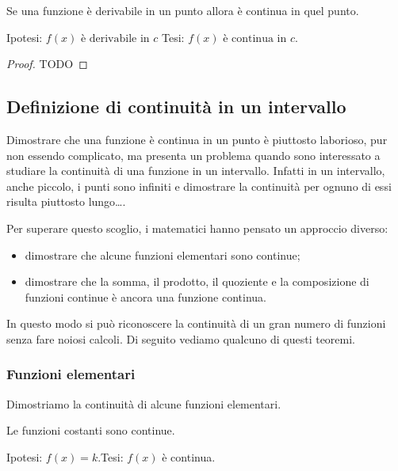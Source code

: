 \begin{teorema}
Se una funzione è derivabile in un punto allora è continua in quel punto.
\end{teorema}

\noindent Ipotesi: 
\(f(x) \text{ è derivabile in } c\)
\tab Tesi: 
\(f(x) \text{ è continua in } c\).

\begin{proof}
TODO
\end{proof}

\subsection{Definizione di continuità in un intervallo}
\label{subsec:cont_definizione}

Dimostrare che una funzione è continua in un punto è piuttosto laborioso, pur 
non essendo complicato, ma presenta un problema quando sono interessato a 
studiare la continuità di una funzione in un intervallo. Infatti in un 
intervallo, anche piccolo, i punti sono infiniti e dimostrare la continuità per 
ognuno di essi risulta piuttosto lungo\dots.

Per superare questo scoglio, i matematici hanno pensato un approccio diverso:

\begin{itemize}
 \item dimostrare che alcune funzioni elementari sono continue;
 \item dimostrare che la somma, il prodotto, il quoziente e la composizione di 
funzioni continue è ancora una funzione continua.
\end{itemize}

In questo modo si può riconoscere la continuità di un gran numero di funzioni 
senza fare noiosi calcoli. Di seguito vediamo qualcuno di questi teoremi.

\subsubsection{Funzioni elementari}
\label{subsubsec:cont_funzionielementari}

Dimostriamo la continuità di alcune funzioni elementari.

\begin{teorema}
Le funzioni costanti sono continue.
\end{teorema}

\noindent Ipotesi: \(f(x)=k\).\tab Tesi: \(f(x)\) è continua.


